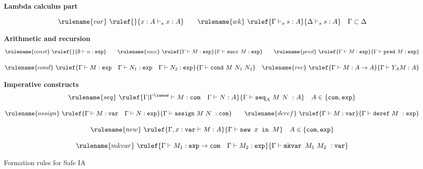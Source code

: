 \begin{FramedTable}
 {\bf Lambda calculus part}

$$ \rulename{var} \ \rulef{}{x : A  \vdash_s x : A}
\qquad \rulename{wk} \ \rulef{\Gamma \vdash_s s :
A}{\Delta \vdash_s s : A} \quad \Gamma \subset
\Delta
$$

\begin{center}
\end{center}
\smallskip


{\bf Arithmetic and recursion}
$$ \rulename{const} \ \rulef{}{\emptyset  \vdash n :\texttt{exp}}
\qquad \rulename{succ} \ \rulef{\Gamma \vdash M:\texttt{exp} }{\Gamma \vdash \texttt{succ}\ M:\texttt{exp}}
\qquad \rulename{pred} \ \rulef{\Gamma \vdash M:\texttt{exp} }{\Gamma \vdash \texttt{pred}\ M:\texttt{exp}}$$

$$
\rulename{cond} \ \rulef{\Gamma\vdash M : \texttt{exp} \quad \Gamma\vdash N_1 : \texttt{exp} \quad \Gamma\vdash N_2 : \texttt{exp} }{\Gamma \vdash \texttt{cond}\ M\ N_1\ N_2}
\quad  \rulename{rec} \ \rulef{\Gamma \vdash M : A\rightarrow A }{ \Gamma \vdash Y_A M : A}$$

{\bf Imperative constructs}
$$ \rulename{seq} \ \rulef{\Gamma| \Gamma^{\ianew} \vdash M : \texttt{com} \quad \Gamma \vdash N :A}
    {\Gamma \vdash \texttt{seq}_A \ M\ N\ : A} \quad A \in \{ \texttt{com}, \texttt{exp}\}$$

$$ \rulename{assign} \ \rulef{\Gamma \vdash M : \texttt{var} \quad \Gamma \vdash N : \texttt{exp}}
    {\Gamma \vdash \texttt{assign}\ M\ N\ : \texttt{com}}
\qquad \rulename{deref} \
 \rulef{\Gamma \vdash M : \texttt{var}}
    {\Gamma \vdash \texttt{deref}\ M\ : \texttt{exp}}$$

$$ \rulename{new} \ \rulef{\Gamma , x : \texttt{var} \vdash M : A}
    {\Gamma  \vdash \texttt{new } x \texttt{ in } M} \quad A \in \{ \texttt{com}, \texttt{exp}\}$$

$$ \rulename{mkvar} \ \rulef{\Gamma \vdash M_1 : \texttt{exp} \rightarrow \texttt{com} \quad \Gamma \vdash M_2 : \texttt{exp}}
    {\Gamma \vdash \texttt{mkvar } M_1\ M_2\ : \texttt{var}}$$

\caption{Formation rules for Safe IA}
\label{tab:safeia_formrules}
\end{FramedTable}


